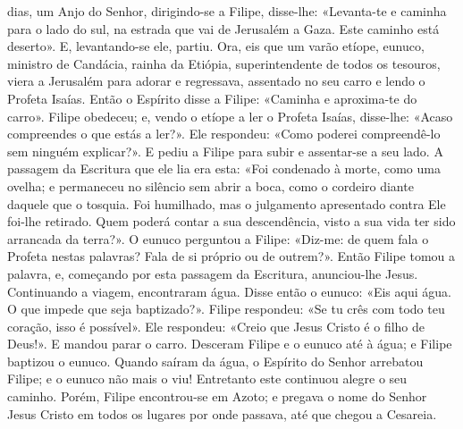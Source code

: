 \begin{paracol}{2}
{ dias, um Anjo do Senhor, dirigindo-se a Filipe, disse-lhe: «Levanta-te e caminha para o lado do sul, na estrada que vai de Jerusalém a Gaza. Este caminho está deserto». E, levantando-se ele, partiu. Ora, eis que um varão etíope, eunuco, ministro de Candácia, rainha da Etiópia, superintendente de todos os tesouros, viera a Jerusalém para adorar e regressava, assentado no seu carro e lendo o Profeta Isaías. Então o Espírito disse a Filipe: «Caminha e aproxima-te do carro». Filipe obedeceu; e, vendo o etíope a ler o Profeta Isaías, disse-lhe: «Acaso compreendes o que estás a ler?». Ele respondeu: «Como poderei compreendê-lo sem ninguém explicar?». E pediu a Filipe para subir e assentar-se a seu lado. A passagem da Escritura que ele lia era esta: «Foi condenado à morte, como uma ovelha; e permaneceu no silêncio sem abrir a boca, como o cordeiro diante daquele que o tosquia. Foi humilhado, mas o julgamento apresentado contra Ele foi-lhe retirado. Quem poderá contar a sua descendência, visto a sua vida ter sido arrancada da terra?». O eunuco perguntou a Filipe: «Diz-me: de quem fala o Profeta nestas palavras? Fala de si próprio ou de outrem?». Então Filipe tomou a palavra, e, começando por esta passagem da Escritura, anunciou-lhe Jesus. Continuando a viagem, encontraram água. Disse então o eunuco: «Eis aqui água. O que impede que seja baptizado?». Filipe respondeu: «Se tu crês com todo teu coração, isso é possível». Ele respondeu: «Creio que Jesus Cristo é o filho de Deus!». E mandou parar o carro. Desceram Filipe e o eunuco até à água; e Filipe baptizou o eunuco. Quando saíram da água, o Espírito do Senhor arrebatou Filipe; e o eunuco não mais o viu! Entretanto este continuou alegre o seu caminho. Porém, Filipe encontrou-se em Azoto; e pregava o nome do Senhor Jesus Cristo em todos os lugares por onde passava, até que chegou a Cesareia.
}\end{paracol}

\begin{paracol}{2}\switchcolumn{}\switchcolumn*{}\switchcolumn{}\end{paracol}

